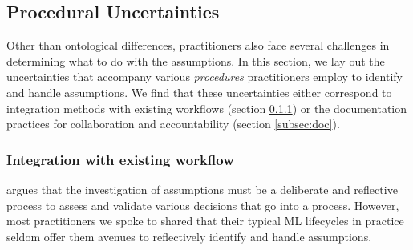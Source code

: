 

\subsection {Procedural Uncertainties}
\label{sec:procedure}

Other than ontological differences, practitioners also face several challenges in determining what to do with the assumptions. In this section, we lay out the uncertainties that accompany various \textit{procedures} practitioners employ to identify and handle assumptions. We find that these uncertainties either correspond to integration methods with existing workflows (section \ref{subsec:integrate}) or the documentation practices for collaboration and accountability (section \ref{subsec:doc}). 


\subsubsection{Integration with existing workflow}
\label{subsec:integrate}
\citet{brookfield1992uncovering} argues that the investigation of assumptions must be a deliberate and reflective process to assess and validate various decisions that go into a process. However, most practitioners we spoke to shared that their typical ML lifecycles in practice seldom offer them avenues to reflectively identify and handle assumptions.


